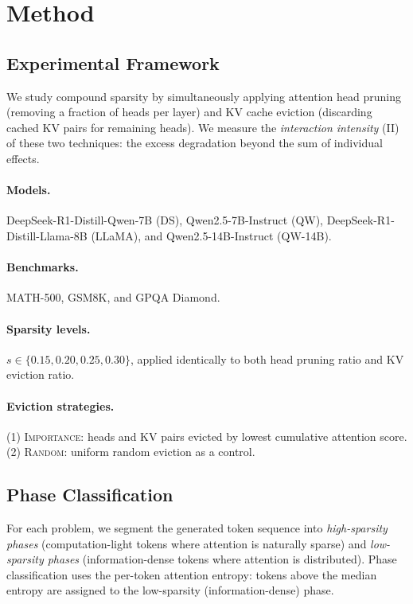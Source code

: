 \documentclass[11pt,a4paper]{article}
\begin{document}
\section{Method}
\label{sec:method}

\subsection{Experimental Framework}

We study compound sparsity by simultaneously applying attention head pruning (removing a fraction of heads per layer) and KV cache eviction (discarding cached KV pairs for remaining heads). We measure the \emph{interaction intensity} (II) of these two techniques: the excess degradation beyond the sum of individual effects.

\paragraph{Models.} DeepSeek-R1-Distill-Qwen-7B (DS), Qwen2.5-7B-Instruct (QW), DeepSeek-R1-Distill-Llama-8B (LLaMA), and Qwen2.5-14B-Instruct (QW-14B).

\paragraph{Benchmarks.} MATH-500, GSM8K, and GPQA Diamond.

\paragraph{Sparsity levels.} $s \in \{0.15, 0.20, 0.25, 0.30\}$, applied identically to both head pruning ratio and KV eviction ratio.

\paragraph{Eviction strategies.} (1) \textsc{Importance}: heads and KV pairs evicted by lowest cumulative attention score. (2) \textsc{Random}: uniform random eviction as a control.

\subsection{Phase Classification}

For each problem, we segment the generated token sequence into \emph{high-sparsity phases} (computation-light tokens where attention is naturally sparse) and \emph{low-sparsity phases} (information-dense tokens where attention is distributed). Phase classification uses the per-token attention entropy: tokens above the median entropy are assigned to the low-sparsity (information-dense) phase.
\end{document}
